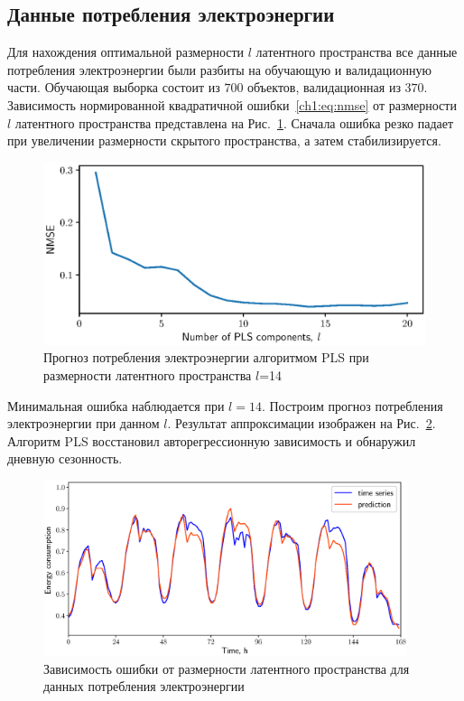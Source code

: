 \subsection*{Данные потребления электроэнергии}

Для нахождения оптимальной размерности $l$ латентного пространства все данные потребления электроэнергии были разбиты на обучающую и валидационную части. 
Обучающая выборка состоит из $700$ объектов, валидационная из $370$. Зависимость нормированной квадратичной ошибки~\eqref{ch1:eq:nmse} от размерности $l$ латентного пространства представлена на Рис.~\ref{ch1:fig:energy_n_comp}. 
Сначала ошибка резко падает при увеличении размерности скрытого пространства, а затем стабилизируется.

\begin{figure}[ht]
	\centering
	\includegraphics[width=0.75\linewidth]{figs/ch1/energy_n_comp}
	\caption{Прогноз потребления электроэнергии алгоритмом PLS при размерности латентного пространства $l$=14}
	\label{ch1:fig:energy_n_comp}
\end{figure}

Минимальная ошибка наблюдается при $l=14$. 
Построим прогноз потребления электроэнергии при данном $l$. 
Результат аппроксимации изображен на Рис.~\ref{ch1:fig:energy_prediction}. Алгоритм PLS восстановил авторегрессионную зависимость и обнаружил дневную сезонность.

\begin{figure}[ht]
	\centering
	\includegraphics[width=0.95\textwidth]{figs/ch1/energy_prediction}
	\caption{Зависимость ошибки от размерности латентного пространства для данных потребления электроэнергии}
	\label{ch1:fig:energy_prediction}
\end{figure}

